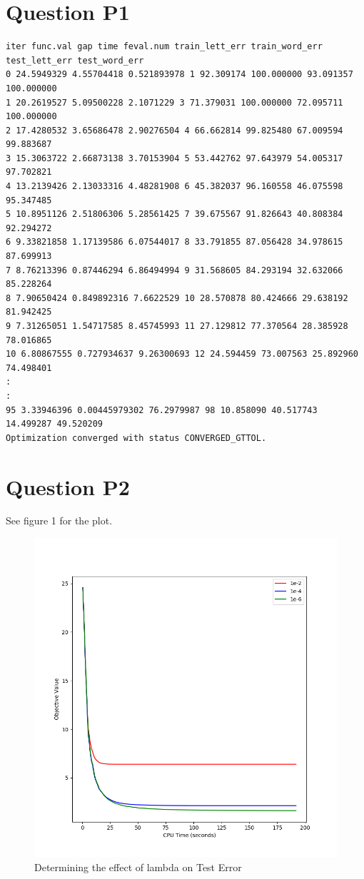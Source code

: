 \documentclass[11pt]{report}
\begin{document}
\maketitle

\section*{Question P1}
\begin{verbatim}
iter func.val gap time feval.num train_lett_err train_word_err test_lett_err test_word_err
0 24.5949329 4.55704418 0.521893978 1 92.309174 100.000000 93.091357 100.000000
1 20.2619527 5.09500228 2.1071229 3 71.379031 100.000000 72.095711 100.000000
2 17.4280532 3.65686478 2.90276504 4 66.662814 99.825480 67.009594 99.883687
3 15.3063722 2.66873138 3.70153904 5 53.442762 97.643979 54.005317 97.702821
4 13.2139426 2.13033316 4.48281908 6 45.382037 96.160558 46.075598 95.347485
5 10.8951126 2.51806306 5.28561425 7 39.675567 91.826643 40.808384 92.294272
6 9.33821858 1.17139586 6.07544017 8 33.791855 87.056428 34.978615 87.699913
7 8.76213396 0.87446294 6.86494994 9 31.568605 84.293194 32.632066 85.228264
8 7.90650424 0.849892316 7.6622529 10 28.570878 80.424666 29.638192 81.942425
9 7.31265051 1.54717585 8.45745993 11 27.129812 77.370564 28.385928 78.016865
10 6.80867555 0.727934637 9.26300693 12 24.594459 73.007563 25.892960 74.498401
:
:
95 3.33946396 0.00445979302 76.2979987 98 10.858090 40.517743 14.499287 49.520209
Optimization converged with status CONVERGED_GTTOL.
\end{verbatim}

\section*{Question P2}
See figure 1 for the plot.
\begin{figure}[b]
\centering
\includegraphics[scale=0.4]{p2_figure.png}
\caption{Determining the effect of lambda on Test Error}
\end{figure}
\end{document}
